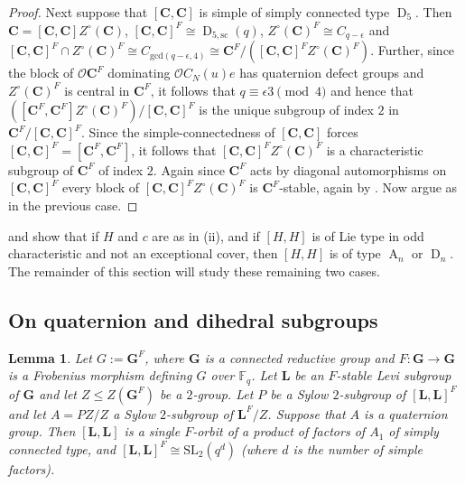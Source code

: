 \documentclass{amsart}
\theoremstyle{plain}\newtheorem{Theorem}{Theorem}[section]
\theoremstyle{plain}\newtheorem{Conjecture}[Theorem]{Conjecture}
\theoremstyle{plain}\newtheorem{Corollary}[Theorem]{Corollary}
\theoremstyle{plain}\newtheorem{Lemma}[Theorem]{Lemma}
\theoremstyle{plain}\newtheorem{Proposition}[Theorem]{Proposition}
\theoremstyle{definition}\newtheorem{Definition}[Theorem]{Definition}
\theoremstyle{definition}\newtheorem{Example}[Theorem]{Example}
\theoremstyle{definition}\newtheorem{Examples}[Theorem]{Examples}
\theoremstyle{definition}\newtheorem{Exercise}[Theorem]{Exercise}
\theoremstyle{definition}\newtheorem{Notation}[Theorem]{Notation}
\theoremstyle{definition}\newtheorem{Remark}[Theorem]{Remark}
\theoremstyle{definition}\newtheorem{Remarks}[Theorem]{Remarks}
\def\CO{{\mathcal{O}}}    \def\OPE{{\mathcal{O}(P\rtimes E)}}
\def\SL{\mathrm{SL}}
\newcommand{\bC}{{\mathbf{C}}}
\newcommand{\bG}{{\mathbf{G}}}
\newcommand{\bL}{{\mathbf{L}}}
\newcommand{\type}{\operatorname}
\newcommand{\FF}{\mathbb{F}}
\numberwithin{equation}{section}
\begin{document}
\begin{proof}
Next suppose that $[\bC,\bC]$  is simple  of  simply connected type $\type{D}_5$.  Then  $\bC = [\bC, \bC] Z^{\circ}(\bC)$,     $[\bC, \bC]^F \cong \type{D}_{5,\mathrm{sc}}(q)$, $ Z^{\circ} (\bC)^F  \cong  C_{q-\epsilon}$  and  
$[\bC, \bC]^F \cap Z^{\circ}(\bC)^F \cong  C_{\mathrm{gcd} (q-\epsilon, 4)}  \cong    \bC^F/ ([\bC, \bC]^F Z^{\circ}(\bC)^F)$.
Further, since  the block of $\CO \bC^F$   dominating $\CO C_N(u) e$   has  quaternion defect groups and $Z^\circ(\bC)^F$ is central in $\bC^F$,  it follows that $q\equiv \epsilon 3 \pmod 4$ and hence that   $([\bC^F , \bC^F]Z^{\circ} (\bC)^F )/[\bC, \bC]^F$ is the unique  subgroup of index $2$  in 
$\bC^F/[\bC, \bC]^F$. Since  the simple-connectedness of $[\bC, \bC]$  forces $[\bC, \bC]^F =[\bC^F, \bC^F] $, it follows that     $[\bC, \bC]^F Z^{\circ}(\bC)^F  $  is a characteristic subgroup of $\bC^F$ of index $2$. Again  since $\bC^F$  acts by diagonal automorphisms on  $[\bC, \bC]^F $ every block of  $[\bC, \bC]^F Z^{\circ}(\bC)^F$ is  $\bC^F$-stable, again by .  Now argue as in  the previous case.
\end{proof}

  and   show that if $H$  and $c$ are as  in  (ii),  and if  $[H, H]$   is  of Lie type in odd characteristic  and not an  exceptional cover, then  $[H,H]$ is  of type $\type{A}_n$ or $\type{D}_n$. The remainder of this section will  study these  remaining two cases.


\subsection {On quaternion and dihedral subgroups} 
\iffalse
\begin{Lemma}\label{lem:basicSL2} 
Let $G:=\bG^F$, where $\bG$ is a  connected reductive group and $F\colon \bG\rightarrow\bG$ is a Frobenius morphism defining $G$ over $\FF_q$. Let $\bL$ be an $F$-stable Levi subgroup of $\bG$  and let $Z \leq Z(\bG^F)$  be  a  $2$-group. Let $P$  be a Sylow $2$-subgroup of $[\bL, \bL]^F$  and  let $ A= PZ/Z $ a  Sylow $2$-subgroup of   $\bL^F/Z $.   Suppose that $A$  is a  quaternion group.  Then $[\bL, \bL]$  is a single  $F$-orbit of a product of  factors of  $A_1 $ of simply connected type, and   $[\bL, \bL]^ F  \cong   \SL_2(q^d) $  (where $d$ is the  number of simple factors).  
\end{Lemma}
\end{document}
